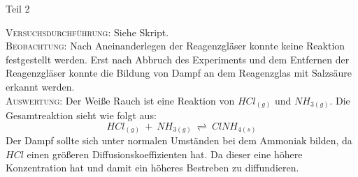\documentclass[11pt, a4paper]{article}
\begin{document}
	\begin{center}
	Teil 2
	\end{center}


\textsc{Versuchsdurchführung:} Siehe Skript.\\

\textsc{Beobachtung:}\hspace{5mm} Nach Aneinanderlegen der Reagenzgläser konnte keine Reaktion festgestellt werden. Erst nach Abbruch des Experiments und dem Entfernen der Reagenzgläser konnte die Bildung von Dampf an dem Reagenzglas mit Salzsäure erkannt werden.\\

\textsc{Auswertung:}\hspace{8mm} Der Weiße Rauch ist eine Reaktion von $HCl_{(g)}$ und $NH_{3 (g)}$. Die Gesamtreaktion sieht wie folgt aus: $$HCl_{(g)}\ +\ NH_{3 (g)}\ \rightleftharpoons\ ClNH_{4 (s)}$$ Der Dampf sollte sich unter normalen Umständen bei dem Ammoniak bilden, da $HCl$ einen größeren Diffusionskoeffizienten hat. Da dieser eine höhere Konzentration hat und damit ein höheres Bestreben zu diffundieren.
\end{document}
